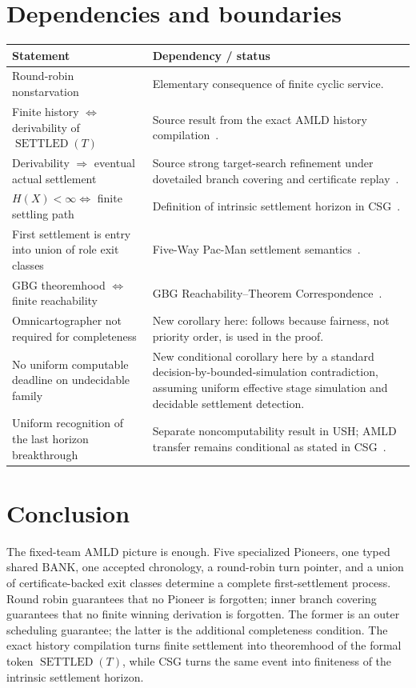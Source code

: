 \documentclass[11pt]{article}
\theoremstyle{remark}
\newcommand{\BANK}{\ensuremath{\mathrm{BANK}}}
\newcommand{\Sett}{\operatorname{SETTLED}}
\begin{document}
\section{Dependencies and boundaries}

\begin{center}
\begin{tabularx}{\textwidth}{@{}p{}X@{}}
\toprule
\textbf{Statement} & \textbf{Dependency / status}\\
\midrule
Round-robin nonstarvation & Elementary consequence of finite cyclic service.\\
Finite history $\Longleftrightarrow$ derivability of $\Sett(T)$ & Source result from the exact AMLD history compilation~\cite{SettlementATP}.\\
Derivability $\Longrightarrow$ eventual actual settlement & Source strong target-search refinement under dovetailed branch covering and certificate replay~\cite{SettlementATP}.\\
$H(X)<\infty\Longleftrightarrow$ finite settling path & Definition of intrinsic settlement horizon in CSG~\cite{CSG}.\\
First settlement is entry into union of role exit classes & Five-Way Pac-Man settlement semantics~\cite{PacMan}.\\
GBG theoremhood $\Longleftrightarrow$ finite reachability & GBG Reachability--Theorem Correspondence~\cite{GBG}.\\
Omnicartographer not required for completeness & New corollary here: follows because fairness, not priority order, is used in the proof.\\
No uniform computable deadline on undecidable family & New conditional corollary here by a standard decision-by-bounded-simulation contradiction, assuming uniform effective stage simulation and decidable settlement detection.\\
Uniform recognition of the last horizon breakthrough & Separate noncomputability result in USH; AMLD transfer remains conditional as stated in CSG~\cite{USH,CSG}.\\
\bottomrule
\end{tabularx}
\end{center}

\section{Conclusion}

The fixed-team AMLD picture is enough.  Five specialized Pioneers, one typed shared \BANK, one accepted chronology, a round-robin turn pointer, and a union of certificate-backed exit classes determine a complete first-settlement process.  Round robin guarantees that no Pioneer is forgotten; inner branch covering guarantees that no finite winning derivation is forgotten.  The former is an outer scheduling guarantee; the latter is the additional completeness condition.  The exact history compilation turns finite settlement into theoremhood of the formal token $\Sett(T)$, while CSG turns the same event into finiteness of the intrinsic settlement horizon.
\end{document}

